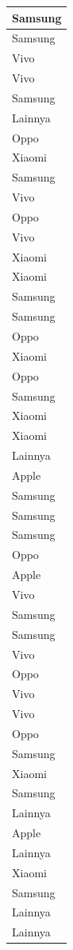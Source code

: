 \documentclass[
  letterpaper,
  DIV=11,
  numbers=noendperiod]{scrartcl}
\begin{document}
\begin{table}
\begin{tabular}[t]{l}
\hline
Samsung\\
\hline
Samsung\\
\hline
Vivo\\
\hline
Vivo\\
\hline
Samsung\\
\hline
Lainnya\\
\hline
Oppo\\
\hline
Xiaomi\\
\hline
Samsung\\
\hline
Vivo\\
\hline
Oppo\\
\hline
Vivo\\
\hline
Xiaomi\\
\hline
Xiaomi\\
\hline
Samsung\\
\hline
Samsung\\
\hline
Oppo\\
\hline
Xiaomi\\
\hline
Oppo\\
\hline
Samsung\\
\hline
Xiaomi\\
\hline
Xiaomi\\
\hline
Lainnya\\
\hline
Apple\\
\hline
Samsung\\
\hline
Samsung\\
\hline
Samsung\\
\hline
Oppo\\
\hline
Apple\\
\hline
Vivo\\
\hline
Samsung\\
\hline
Samsung\\
\hline
Vivo\\
\hline
Oppo\\
\hline
Vivo\\
\hline
Vivo\\
\hline
Oppo\\
\hline
Samsung\\
\hline
Xiaomi\\
\hline
Samsung\\
\hline
Lainnya\\
\hline
Apple\\
\hline
Lainnya\\
\hline
Xiaomi\\
\hline
Samsung\\
\hline
Lainnya\\
\hline
Lainnya\\

\end{tabular}
\end{table}
\end{document}

